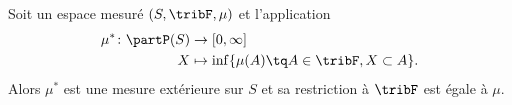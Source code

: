 \begin{proposition}    \label{PropFDUooVxJaJ}
	Soit un espace mesuré \( (S,\tribF,\mu)\) et l'application
	\begin{equation}
		\begin{aligned}
			\mu^*\colon \partP(S) & \to \mathopen[ 0 , \infty \mathclose]              \\
			X                     & \mapsto \inf\{ \mu(A)\tq A\in\tribF,X\subset A \}.
		\end{aligned}
	\end{equation}
	Alors \( \mu^*\) est une mesure extérieure sur \( S\) et sa restriction à \( \tribF\) est égale à \( \mu\).
\end{proposition}

